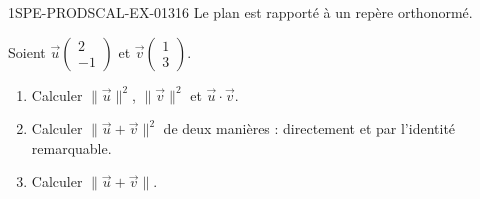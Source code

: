 \begin{exercice}{1SPE-PRODSCAL-EX-013}{1}{6}
Le plan est rapporté à un repère orthonormé.

Soient $\vec{u}\begin{pmatrix} 2 \\ -1 \end{pmatrix}$ et $\vec{v}\begin{pmatrix} 1 \\ 3 \end{pmatrix}$.
\begin{enumerate}
  \item Calculer $\|\vec{u}\|^2$, $\|\vec{v}\|^2$ et $\vec{u} \cdot \vec{v}$.
  \item Calculer $\|\vec{u} + \vec{v}\|^2$ de deux manières : directement et par l'identité remarquable.
  \item Calculer $\|\vec{u} + \vec{v}\|$.
\end{enumerate}
\end{exercice}
